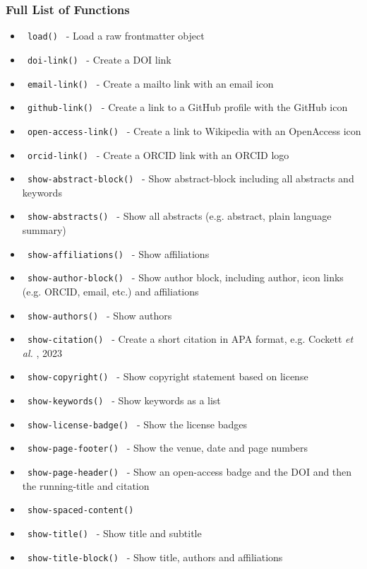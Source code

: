 \pandocbounded{\texttt{[image: https://raw.githubusercontent.com/curvenote/pubmatter/main/images/normalized.png?raw=true]}}

\subsubsection{Full List of Functions}\label{full-list-of-functions}

\begin{itemize}
\tightlist
\item
  \texttt{\ load()\ } - Load a raw frontmatter object
\item
  \texttt{\ doi-link()\ } - Create a DOI link
\item
  \texttt{\ email-link()\ } - Create a mailto link with an email icon
\item
  \texttt{\ github-link()\ } - Create a link to a GitHub profile with
  the GitHub icon
\item
  \texttt{\ open-access-link()\ } - Create a link to Wikipedia with an
  OpenAccess icon
\item
  \texttt{\ orcid-link()\ } - Create a ORCID link with an ORCID logo
\item
  \texttt{\ show-abstract-block()\ } - Show abstract-block including all
  abstracts and keywords
\item
  \texttt{\ show-abstracts()\ } - Show all abstracts (e.g. abstract,
  plain language summary)
\item
  \texttt{\ show-affiliations()\ } - Show affiliations
\item
  \texttt{\ show-author-block()\ } - Show author block, including
  author, icon links (e.g. ORCID, email, etc.) and affiliations
\item
  \texttt{\ show-authors()\ } - Show authors
\item
  \texttt{\ show-citation()\ } - Create a short citation in APA format,
  e.g. Cockett \emph{et al.} , 2023
\item
  \texttt{\ show-copyright()\ } - Show copyright statement based on
  license
\item
  \texttt{\ show-keywords()\ } - Show keywords as a list
\item
  \texttt{\ show-license-badge()\ } - Show the license badges
\item
  \texttt{\ show-page-footer()\ } - Show the venue, date and page
  numbers
\item
  \texttt{\ show-page-header()\ } - Show an open-access badge and the
  DOI and then the running-title and citation
\item
  \texttt{\ show-spaced-content()\ }
\item
  \texttt{\ show-title()\ } - Show title and subtitle
\item
  \texttt{\ show-title-block()\ } - Show title, authors and affiliations
\end{itemize}


